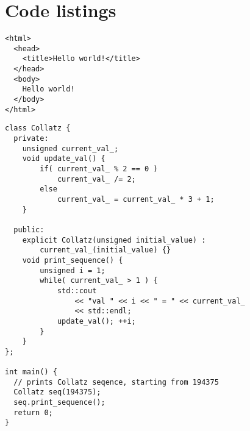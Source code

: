\newpage %
\section{Code listings}

\begin{verbatim}
<html>
  <head>
    <title>Hello world!</title>
  </head>
  <body>
    Hello world!
  </body>
</html>
\end{verbatim}

\lipsum[2]

\begin{verbatim}
class Collatz {
  private:
    unsigned current_val_;
    void update_val() {
        if( current_val_ % 2 == 0 )
            current_val_ /= 2;
        else
            current_val_ = current_val_ * 3 + 1;
    }

  public:
    explicit Collatz(unsigned initial_value) : 
        current_val_(initial_value) {}
    void print_sequence() {
        unsigned i = 1;
        while( current_val_ > 1 ) {
            std::cout
                << "val " << i << " = " << current_val_
                << std::endl;
            update_val(); ++i;
        }
    }
};

int main() {
  // prints Collatz seqence, starting from 194375
  Collatz seq(194375);
  seq.print_sequence();
  return 0;
}
\end{verbatim}
